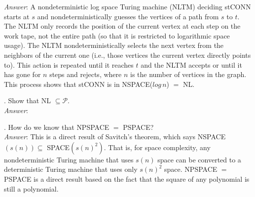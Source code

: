 \documentclass{scrartcl}
\begin{document}
    \noindent
    \textit{Answer}: A nondeterministic log space Turing machine (NLTM) deciding \textsf{stCONN}
    starts at $s$ and nondeterministically guesses the vertices of a path from $s$ to $t$. The NLTM
    only records the position of the current vertex at each step on the work tape, not the entire
    path (so that it is restricted to logarithmic space usage). The NLTM nondeterministically
    selects the next vertex from the neighbors of the current one (i.e., those vertices the current
    vertex directly points to). This action is repeated until it reaches $t$ and the NLTM accepts or
    until it has gone for $n$ steps and rejects, where $n$ is the number of vertices in the graph.
    This process shows that \textsf{stCONN} is in \textsf{NSPACE($log\,n$) $=$ NL}.

    \newpage
    . Show that \textsf{NL} $\subseteq \mathcal{P}$.\\

    \noindent
    \textit{Answer}:

    \bigskip
    . How do we know that \textsf{NPSPACE $=$ PSPACE}?\\

    \noindent
    \textit{Answer}: This is a direct result of Savitch's theorem, which says \textsf{NSPACE$(s(n))
    \subseteq$ SPACE$(s(n)^2)$}. That is, for space complexity, any nondeterministic Turing machine
    that uses $s(n)$ space can be converted to a deterministic Turing machine that uses only
    $s(n)^2$ space. \textsf{NPSPACE $=$ PSPACE} is a direct result based on the fact that the square
    of any polynomial is still a polynomial.\\
\end{document}
